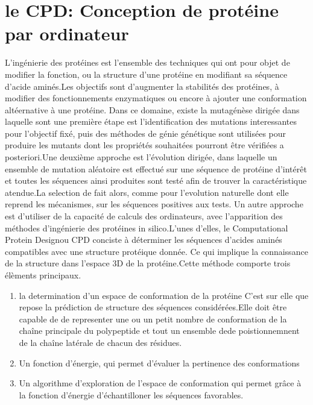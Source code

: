 
\chapter{le \og CPD\fg: Conception de protéine par ordinateur}
\label{chap:CPD}

L'ingénierie des protéines est l'ensemble des techniques qui ont pour objet de modifier la fonction, ou la structure d'une protéine en modifiant sa séquence d'acide aminés.Les objectifs sont d'augmenter la stabilités des protéines, à modifier des fonctionnements enzymatiques ou encore à ajouter une conformation altéernative à une protéine.
Dans ce domaine, existe la mutagénèse dirigée dans laquelle sont une première étape est l'identification des mutations interessantes pour l'objectif fixé, puis des méthodes de génie génétique sont utilisées pour produire les mutants dont les propriétés souhaitées pourront être vérifiées a posteriori.Une deuxième approche est l'évolution dirigée, dans laquelle un ensemble de mutation aléatoire est effectué sur une séquence de protéine d'intérêt et toutes les séquences ainsi produites sont testé afin de trouver la caractéristique atendue.La selection de fait alors, comme pour l'evolution naturelle dont elle reprend les mécanismes, sur les séquences positives aux tests.
Un autre approche est d'utiliser de la capacité de calculs des ordinateurs, avec l'apparition des méthodes d'ingénierie des protéines \og in silico\fg.L'unes d'elles, le \og Computational Protein Design\fg ou CPD conciste à déterminer les séquences d'acides aminés compatibles avec une structure protéique donnée. Ce qui implique la connaissance de la structure dans l'espace 3D de la protéine.Cette méthode comporte trois élèments principaux.

\begin{enumerate}
\item la determination d'un espace de conformation de la protéine
  C'est sur elle que repose la prédiction de structure des séquences considérées.Elle doit être capable de de representer une ou un petit nombre de conformation de la chaîne principale du polypeptide et tout un ensemble dede poistionnemnent de la chaîne latérale de chacun des résidues.
\item Un fonction d'énergie, qui permet d'évaluer la pertinence des conformations 
\item Un algorithme d'exploration de l'espace de conformation qui permet grâce à la fonction d'énergie d'échantilloner les séquences favorables.
  
\end{enumerate}

